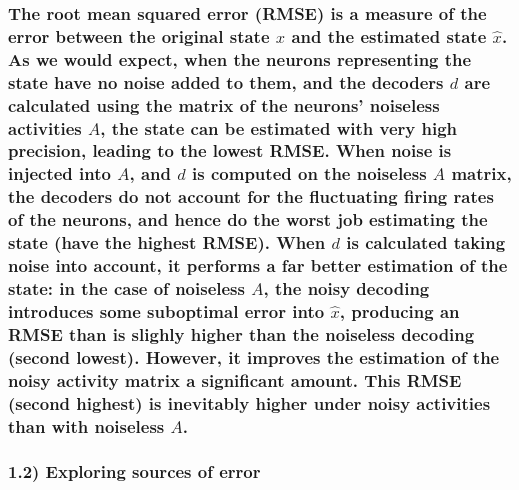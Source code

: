 \documentclass{article}
\begin{document}
    \subsubsection{The root mean squared error (RMSE) is a measure of the
error between the original state $x$ and the estimated state $\hat{x}$.
As we would expect, when the neurons representing the state have no
noise added to them, and the decoders $d$ are calculated using the
matrix of the neurons' noiseless activities $A$, the state can be
estimated with very high precision, leading to the lowest RMSE. When
noise is injected into $A$, and $d$ is computed on the noiseless $A$
matrix, the decoders do not account for the fluctuating firing rates of
the neurons, and hence do the worst job estimating the state (have the
highest RMSE). When $d$ is calculated taking noise into account, it
performs a far better estimation of the state: in the case of noiseless
$A$, the noisy decoding introduces some suboptimal error into $\hat{x}$,
producing an RMSE than is slighly higher than the noiseless decoding
(second lowest). However, it improves the estimation of the noisy
activity matrix a significant amount. This RMSE (second highest) is
inevitably higher under noisy activities than with noiseless
$A$.}\label{the-root-mean-squared-error-rmse-is-a-measure-of-the-error-between-the-original-state-x-and-the-estimated-state-hatx.-as-we-would-expect-when-the-neurons-representing-the-state-have-no-noise-added-to-them-and-the-decoders-d-are-calculated-using-the-matrix-of-the-neurons-noiseless-activities-a-the-state-can-be-estimated-with-very-high-precision-leading-to-the-lowest-rmse.-when-noise-is-injected-into-a-and-d-is-computed-on-the-noiseless-a-matrix-the-decoders-do-not-account-for-the-fluctuating-firing-rates-of-the-neurons-and-hence-do-the-worst-job-estimating-the-state-have-the-highest-rmse.-when-d-is-calculated-taking-noise-into-account-it-performs-a-far-better-estimation-of-the-state-in-the-case-of-noiseless-a-the-noisy-decoding-introduces-some-suboptimal-error-into-hatx-producing-an-rmse-than-is-slighly-higher-than-the-noiseless-decoding-second-lowest.-however-it-improves-the-estimation-of-the-noisy-activity-matrix-a-significant-amount.-this-rmse-second-highest-is-inevitably-higher-under-noisy-activities-than-with-noiseless-a.}

    \subsubsection{1.2) Exploring sources of
error}\label{exploring-sources-of-error}
\end{document}
